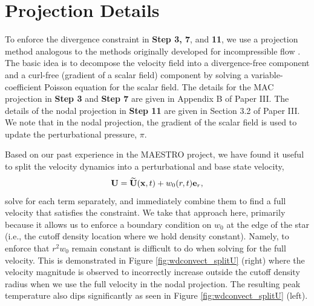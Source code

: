 \appendix
\section{Projection Details}\label{Sec:Projection}
To enforce the divergence constraint in {\bf Step 3, 7}, and {\bf 11}, we use a projection method analogous to the methods originally developed for incompressible flow \citep{almgren1998conservative,bell1989second}.
The basic idea is to decompose the velocity field into a divergence-free component and a curl-free (gradient of a scalar field) component by solving a variable-coefficient Poisson equation for the scalar field.
The details for the MAC projection in {\bf Step 3} and {\bf Step 7} are given in Appendix B of Paper III.  The details of the nodal projection in {\bf Step 11} are given in Section 3.2 of Paper III.
We note that in the nodal projection, the gradient of the scalar field is used to update the perturbational pressure, $\pi$.

Based on our past experience in the MAESTRO project, we have found it useful to split the velocity dynamics into a perturbational and base state velocity,
\begin{equation}
\Ub = \Ubt(\xb,t) + w_0(r,t)\eb_r,
\end{equation}
solve for each term separately, and immediately combine them to find a full velocity that satisfies the constraint.  We take that approach here, primarily because it allows us to enforce a boundary condition on $w_0$ at the edge of the star (i.e., the cutoff density location where we hold density constant).  Namely, to enforce that $r^2 w_0$ remain constant is difficult to do when solving for the full velocity. 
This is demonstrated in Figure \ref{fig:wdconvect_splitU} (right) where the velocity magnitude is observed to incorrectly increase outside the cutoff density radius when we use the full velocity in the nodal projection. The resulting peak temperature also dips significantly as seen in Figure \ref{fig:wdconvect_splitU} (left).   

